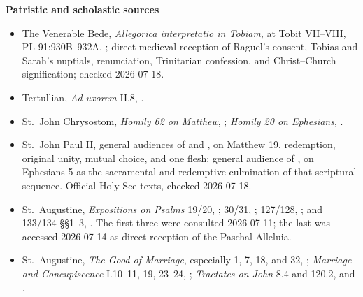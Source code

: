 \textbf{Patristic and scholastic sources}
{\fontsize{8.3}{9.2}\selectfont
\begin{itemize}[itemsep=0em,topsep=0.15em,parsep=0pt]
\item The Venerable Bede, \emph{Allegorica interpretatio in Tobiam}, at Tobit VII--VIII, PL 91:930B--932A, ; direct medieval reception of Raguel's consent, Tobias and Sarah's nuptials, renunciation, Trinitarian confession, and Christ--Church signification; checked 2026-07-18.
\item Tertullian, \emph{Ad uxorem} II.8, .
\item St.~John Chrysostom, \emph{Homily 62 on Matthew}, ; \emph{Homily 20 on Ephesians}, .
\item St.~John Paul II, general audiences of  and , on Matthew 19, redemption, original unity, mutual choice, and one flesh; general audience of , on Ephesians 5 as the sacramental and redemptive culmination of that scriptural sequence. Official Holy See texts, checked 2026-07-18.
\item St.~Augustine, \emph{Expositions on Psalms} 19/20, ; 30/31, ; 127/128, ; and 133/134 \S\S1--3, . The first three were consulted 2026-07-11; the last was accessed 2026-07-14 as direct reception of the Paschal Alleluia.
\item St.~Augustine, \emph{The Good of Marriage}, especially 1, 7, 18, and 32, ; \emph{Marriage and Concupiscence} I.10--11, 19, 23--24, ; \emph{Tractates on John} 8.4 and 120.2,  and .

\end{itemize}}

